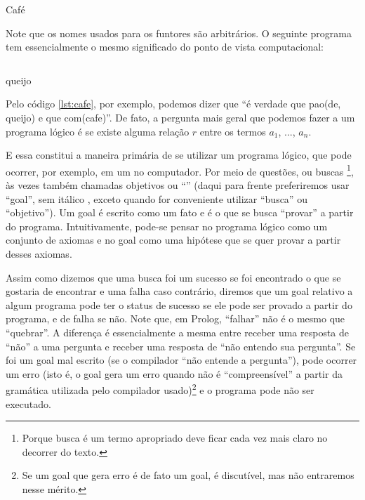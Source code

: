     \begin{listing}
\inputminted{prolog}{../Exemplos/Cap0/prog1_cafe.pl}
    \caption{Café}\label{lst:cafe}
    \end{listing}

Note que os nomes usados para os funtores são arbitrários. O seguinte programa tem essencialmente o mesmo significado do ponto de vista computacional:\\

%
    \begin{listing}
\inputminted{prolog}{../Exemplos/Cap0/prog2_queijo.pl}
\caption{queijo}\label{lst:queijo}
    \end{listing}



Pelo código \ref{lst:cafe}, por exemplo, podemos dizer que ``é verdade que pao(de, queijo) e que com(cafe)''. De fato, a pergunta mais
geral que podemos fazer a um programa lógico é se existe alguma relação $r$ entre os termos $a_1$, ..., $a_n$.

E essa constitui a maneira primária de se utilizar um programa lógico, que pode ocorrer, por
exemplo, em um  no computador. Por meio de questões, ou buscas \footnote{Porque
  busca é um termo apropriado deve ficar cada vez mais claro no decorrer do texto.}, às vezes também
chamadas objetivos ou ``'' (daqui para frente preferiremos usar ``goal'', sem
itálico %
, exceto quando for conveniente utilizar ``busca'' ou ``objetivo''). Um goal é escrito como
um fato e é o que se busca ``provar'' a partir do programa. Intuitivamente, pode-se pensar no
programa lógico como um conjunto de axiomas e no goal como uma hipótese que se quer provar a partir desses axiomas.

Assim como dizemos que uma busca foi um sucesso se foi encontrado o que se gostaria de encontrar e uma falha caso contrário,
diremos que um goal relativo a algum programa pode ter o status de sucesso se ele pode ser provado a partir do programa, e de
falha se não. Note que, em Prolog, ``falhar'' não é o mesmo que ``quebrar''. A diferença é
essencialmente a mesma entre receber uma resposta de ``não'' a uma pergunta e receber uma resposta de
``não entendo sua pergunta''.  Se foi um goal mal escrito (se o compilador ``não entende a
pergunta''), pode ocorrer um erro (isto é, o goal gera um erro quando não é ``compreensível'' a
partir da gramática utilizada pelo compilador usado)\footnote{Se um goal que gera erro é de fato um
  goal, é discutível, mas não entraremos nesse mérito.} e o programa pode não ser executado.

